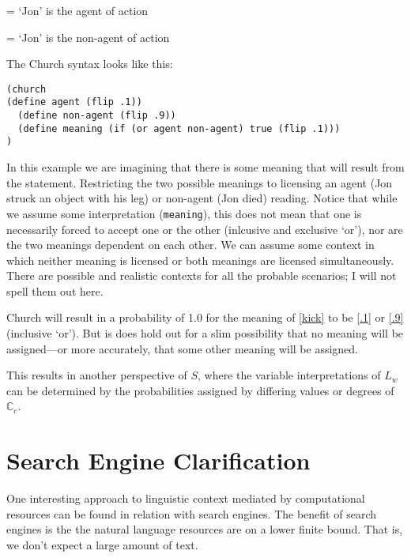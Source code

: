 \documentclass{article}
\begin{document}
 = `Jon' is the agent of action\label{.1} 
\xe

 = `Jon' is the non-agent of action\label{.9}
\xe

The Church syntax looks like this:

\ex 
\begin{verbatim}
(church
(define agent (flip .1))
  (define non-agent (flip .9))
  (define meaning (if (or agent non-agent) true (flip .1)))
)
\end{verbatim}
\xe

 
In this example we are imagining that there is some meaning that will result from the statement. Restricting the two possible meanings to licensing an agent (Jon struck an object with his leg) or non-agent (Jon died) reading. Notice that while we assume some interpretation (\texttt{meaning}), this does not mean that one is necessarily forced to accept one or the other (inlcusive and exclusive `or'), nor are the two meanings dependent on each other. We can assume some context in which neither meaning is licensed or both meanings are licensed simultaneously. There are possible and realistic contexts for all the probable scenarios; I will not spell them out here. 

Church will result in a probability of 1.0 for the meaning of \ref{kick} to be \ref{.1} or \ref{.9} (inclusive `or'). But is does hold out for a slim possibility that no meaning will be assigned---or more accurately, that some other meaning will be assigned.

This results in another perspective of $S$, where the variable interpretations of $L_w$ can be determined by the probabilities assigned by differing values or degrees of $\mathbb{C}_c$. 


\section{Search Engine Clarification}
One interesting approach to linguistic context mediated by computational resources can be found in relation with search engines. The benefit of search engines is the the natural language resources are on a lower finite bound. That is, we don't expect a large amount of text. 


\end{document}
